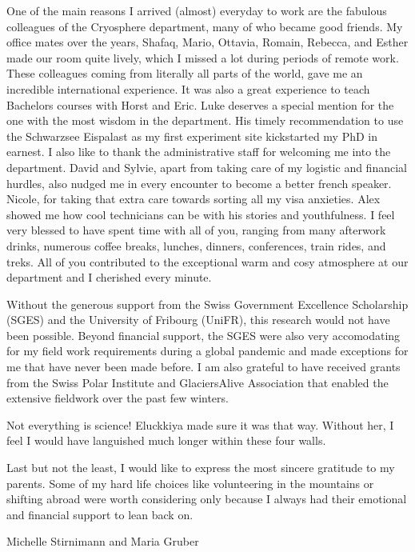 One of the main reasons I arrived (almost) everyday to work are the fabulous colleagues of the Cryosphere
department, many of who became good friends. My office mates over the years, Shafaq, Mario, Ottavia, Romain,
Rebecca, and Esther made our room quite lively, which I missed a lot during periods of remote work.
These colleagues coming from literally all parts of the world, gave me an incredible international experience.
It was also a great experience to teach Bachelors courses with Horst and Eric. Luke deserves a special mention
for the one with the most wisdom in the department. His timely recommendation to use the Schwarzsee Eispalast as
my first experiment site kickstarted my PhD in earnest. I also like to thank the administrative staff for
welcoming me into the department. David and Sylvie, apart from taking care of my logistic and financial hurdles,
also nudged me in every encounter to become a better french speaker. Nicole, for taking that extra care towards
sorting all my visa anxieties. Alex showed me how cool technicians can be with his stories and youthfulness. I
feel very blessed to have spent time with all of you, ranging from many afterwork drinks, numerous coffee
breaks, lunches, dinners, conferences, train rides, and treks. All of you contributed to the exceptional warm
and cosy atmosphere at our department and I cherished every minute. 

Without the generous support from the Swiss Government Excellence Scholarship (SGES) and the University of
Fribourg (UniFR), this research would not have been possible. Beyond financial support, the SGES were also very
accomodating for my field work requirements during a global pandemic and made exceptions for me that have never
been made before. I am also grateful to have received grants from the Swiss Polar Institute and GlaciersAlive
Association that enabled the extensive fieldwork over the past few winters. 

Not everything is science! Eluckkiya made sure it was that way. Without her, I feel I would have languished much
longer within these four walls.

Last but not the least, I would like to express the most sincere gratitude to my parents. Some of my hard life
choices like volunteering in the mountains or shifting abroad were worth considering only because I always had
their emotional and financial support to lean back on.

Michelle Stirnimann and Maria Gruber

